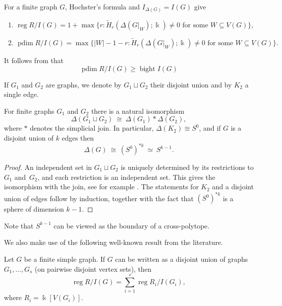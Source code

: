 \documentclass[12pt]{amsart}
\theoremstyle{plain}
\theoremstyle{definition}
\DeclareMathOperator{\reg}{reg}
\DeclareMathOperator{\pdim}{pdim}
\DeclareMathOperator{\bight}{bight}
\begin{document}
\begin{remark}\label{rem:reg_pdim}
For a finite graph $G$, Hochster's formula and $I_{\Delta(G)}=I(G)$ give
\begin{enumerate}
\item[(a)] $
\reg R/I(G)=1+\max\{r:\widetilde H_r(\Delta(G|_W);\Bbbk)\neq 0\text{ for some }W\subseteq V(G)\},
$
\item[(b)] $
\pdim R/I(G)=\max\{|W|-1-r:\widetilde H_r(\Delta(G|_W);\Bbbk)\neq 0\text{ for some }W\subseteq V(G)\}.
$
\end{enumerate}
\end{remark}


\begin{remark}\label{rem:bight_pdim}
    It follows from \cite[Proposition 4.7.]{ProjDim} that 
    $$\pdim R/I(G)\geq \bight I(G)$$
\end{remark}


If $G_1$ and $G_2$ are graphs, we denote by $G_1\sqcup G_2$ their disjoint union and by $K_2$ a single
edge.

\begin{lem}\label{lem:ind-join}
For finite graphs $G_1$ and $G_2$ there is a natural isomorphism
\[
  \Delta(G_1\sqcup G_2)\ \cong\ \Delta(G_1)*\Delta(G_2),
\]
where $*$ denotes the simplicial join.
In particular, $\Delta(K_2)\cong S^0$, and if $G$ is a disjoint union of $k$ edges then
\[
  \Delta(G)\ \cong\ (S^0)^{*k}\ \simeq\ S^{k-1}.
\]
\end{lem}

\begin{proof}
An independent set in $G_1\sqcup G_2$ is uniquely determined by its restrictions to $G_1$ and~$G_2$,
and each restriction is an independent set. This gives the isomorphism with the join, see for
example \cite{JonssonGraphs, KozlovInd}. The statements for $K_2$ and a disjoint union of edges follow
by induction, together with the fact that $(S^0)^{*k}$ is a sphere of dimension $k-1$.
\end{proof}

\begin{remark}
Note that $S^{k-1}$ can be viewed as the boundary of a cross-polytope.
\end{remark}


We also make use of the following well-known result from the literature.


\begin{lem}\label{lem:disjoint_sum}
Let $G$ be a finite simple graph. If $G$ can be written as a disjoint union of graphs
$G_1,\ldots,G_s$ (on pairwise disjoint vertex sets), then
\[
\reg R/I(G) =  \sum_{i=1}^s \reg R_i/I(G_i),
\]
where $R_i=\Bbbk[V(G_i)]$.
\end{lem}
\end{document}
